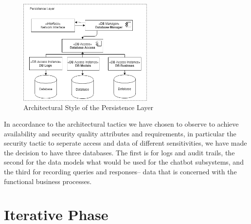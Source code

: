 \documentclass[11pt]{article}
\begin{document}
\begin{figure}[H]
	\centering
	\includegraphics[width=0.6\textwidth]{../../images/Persistence_Layer_Architecture.png}
	\caption{Architectural Style of the Persistence Layer}
\end{figure}

In accordance to the architectural tactics we have chosen to observe to achieve availability and security quality attributes and requirements, in particular the security tactic to seperate access and data of different sensitivities, we have made the decision to have three databases. The first is for logs and audit trails, the second for the data models what would be used for the chatbot subsystems, and the third for recording queries and responses-- data that is concerned with the functional business processes.

\section{Iterative Phase}


\end{document}
